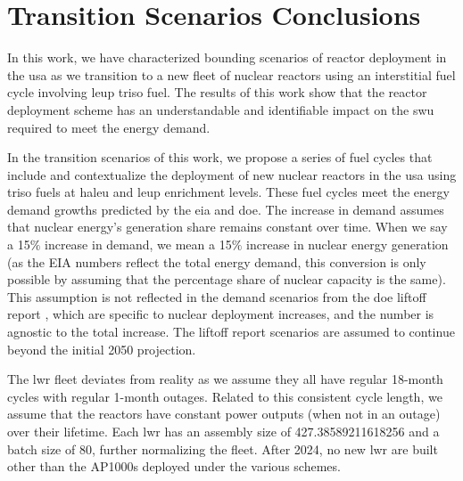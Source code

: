 \section{Transition Scenarios Conclusions}
\label{sec:dep_conc}


In this work, we have characterized bounding scenarios of reactor deployment in the \gls{usa} as we transition to a new fleet of nuclear reactors using an interstitial fuel cycle involving \gls{leup} \gls{triso} fuel. The results of this work show that the reactor deployment scheme has an understandable and identifiable impact on the \gls{swu} required to meet the energy demand.

In the transition scenarios of this work, we propose a series of fuel cycles that include and contextualize the deployment of new nuclear reactors in the \gls{usa} using \gls{triso} fuels at \gls{haleu} and \gls{leup} enrichment levels. These fuel cycles meet the energy demand growths predicted by the \gls{eia} and \gls{doe}. The increase in demand assumes that nuclear energy's generation share remains constant over time. When we say a 15$\%$ increase in demand, we mean a 15$\%$ increase in nuclear energy generation (as the EIA numbers \cite{eia_aeo_2023} reflect the total energy demand, this conversion is only possible by assuming that the percentage share of nuclear capacity is the same). This assumption is not reflected in the demand scenarios from the \gls{doe} liftoff report \cite{julie_liftoff_pathways_2024}, which are specific to nuclear deployment increases, and the number is agnostic to the total increase. The liftoff report scenarios are assumed to continue beyond the initial 2050 projection.

The \gls{lwr} fleet deviates from reality as we assume they all have regular 18-month cycles with regular 1-month outages. Related to this consistent cycle length, we assume that the reactors have constant power outputs (when not in an outage) over their lifetime. Each \gls{lwr} has an assembly size of 427.38589211618256 and a batch size of 80,  further normalizing the fleet. After 2024, no new \gls{lwr} are built other than the AP1000s deployed under the various schemes.

